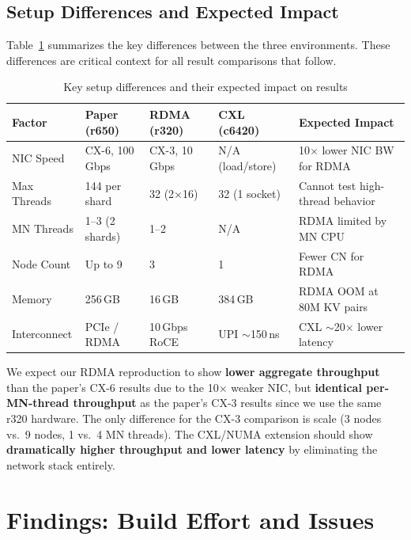 \documentclass[conference]{IEEEtran}
\begin{document}
\subsection{Setup Differences and Expected Impact}

Table~\ref{tab:setup-diff} summarizes the key differences between the three environments. These differences are critical context for all result comparisons that follow.

\begin{table}[H]
\centering
\caption{Key setup differences and their expected impact on results}
\label{tab:setup-diff}
\small
\begin{tabular}{@{}p{2.2cm}p{2.8cm}p{2.8cm}p{2.8cm}p{3cm}@{}}
\toprule
\textbf{Factor} & \textbf{Paper (r650)} & \textbf{RDMA (r320)} & \textbf{CXL (c6420)} & \textbf{Expected Impact} \\
\midrule
NIC Speed & CX-6, 100\,Gbps & CX-3, 10\,Gbps & N/A (load/store) & 10$\times$ lower NIC BW for RDMA \\
Max Threads & 144 per shard & 32 (2$\times$16) & 32 (1 socket) & Cannot test high-thread behavior \\
MN Threads & 1--3 (2 shards) & 1--2 & N/A & RDMA limited by MN CPU \\
Node Count & Up to 9 & 3 & 1 & Fewer CN for RDMA \\
Memory & 256\,GB & 16\,GB & 384\,GB & RDMA OOM at 80M KV pairs \\
Interconnect & PCIe / RDMA & 10\,Gbps RoCE & UPI $\sim$150\,ns & CXL $\sim$20$\times$ lower latency \\
\bottomrule
\end{tabular}
\end{table}

We expect our RDMA reproduction to show \textbf{lower aggregate throughput} than the paper's CX-6 results due to the 10$\times$ weaker NIC, but \textbf{identical per-MN-thread throughput} as the paper's CX-3 results since we use the same r320 hardware. The only difference for the CX-3 comparison is scale (3 nodes vs.\ 9 nodes, 1 vs.\ 4 MN threads). The CXL/NUMA extension should show \textbf{dramatically higher throughput and lower latency} by eliminating the network stack entirely.

\section{Findings: Build Effort and Issues}
\end{document}
